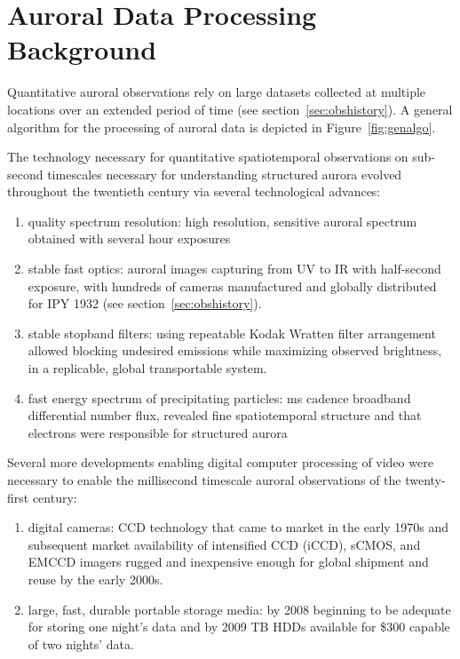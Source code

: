 \section{Auroral Data Processing Background}\label{sec:prochistory}
Quantitative auroral observations rely on large datasets collected at multiple locations over an extended period of time (see section~\ref{sec:obshistory}).
A general algorithm for the processing of auroral data is depicted in Figure~\ref{fig:genalgo}.

The technology necessary for quantitative spatiotemporal observations on sub-second timescales necessary for understanding structured aurora evolved throughout the twentieth century via several technological advances:
\begin{enumerate}
    \item quality spectrum resolution: \citep{sykora1901} high resolution, sensitive auroral spectrum obtained with several hour exposures %
    \item stable fast optics: \citep{stormer1932} auroral images capturing from UV to IR with half-second exposure, with hundreds of cameras manufactured and globally distributed for IPY 1932 (see section~\ref{sec:obshistory}).
    \item stable stopband filters: \citep{rayleigh1924} using repeatable Kodak Wratten filter arrangement allowed blocking undesired emissions while maximizing observed brightness, in a replicable, global transportable system.
    \item fast energy spectrum of precipitating particles: \citep{sharp1965} \unit[8]{ms} cadence broadband differential number flux, revealed fine spatiotemporal structure and that electrons were responsible for structured aurora
\end{enumerate} 
Several more developments enabling digital computer processing of video were necessary to enable the millisecond timescale auroral observations of the twenty-first century:
\begin{enumerate}[resume]
    \item digital cameras: CCD technology that came to market in the early 1970s and subsequent market availability of intensified CCD (iCCD), sCMOS, and EMCCD imagers rugged and inexpensive enough for global shipment and reuse by the early 2000s.
    \item large, fast, durable portable storage media: by 2008 beginning to be adequate for storing one night's data and by 2009 \unit[2]{TB} HDDs available for \$300 \citep{first2tb} capable of two nights' data.
\end{enumerate}

